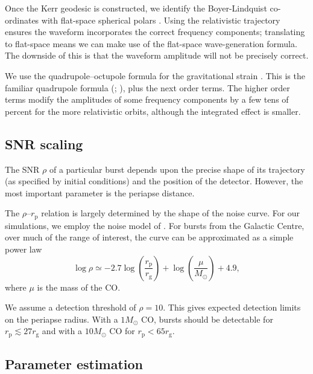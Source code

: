 \documentclass[useAMS,usedcolumn,usegraphicx,usenatbib]{mn2e}
\newcommand{\sub}[1]{\ensuremath{_\mathrm{#1}}}
\begin{document}
Once the Kerr geodesic is constructed, we identify the Boyer-Lindquist co-ordinates with flat-space spherical polars \citep{Gair2005, Babak2007}. Using the relativistic trajectory ensures the waveform incorporates the correct frequency components; translating to flat-space means we can make use of the flat-space wave-generation formula. The downside of this is that the waveform amplitude will not be precisely correct.

We use the quadrupole--octupole formula for the gravitational strain \citep{Bekenstein1973, Press1977, Yunes2008}. This is the familiar quadrupole formula (\citealt*[section 36.10]{Misner1973}; \citealt[section 17.9]{Hobson2006}), plus the next order terms. The higher order terms modify the amplitudes of some frequency components by a few tens of percent for the more relativistic orbits, although the integrated effect is smaller.

\subsection{SNR scaling}\label{sec:SNR}

The SNR $\rho$ of a particular burst depends upon the precise shape of its trajectory (as specified by initial conditions) and the position of the detector. However, the most important parameter is the periapse distance.

The $\rho$--$r\sub{p}$ relation is largely determined by the shape of the noise curve. For our simulations, we employ the noise model of \citet{Barack2004}. For bursts from the Galactic Centre, over much of the range of interest, the curve can be approximated as a simple power law \citep{Berry2013}
\begin{equation}
\log\rho \simeq -2.7\log\left(\frac{r\sub{p}}{r\sub{g}}\right) + \log\left(\frac{\mu}{M_\odot}\right) + 4.9,
\label{eq:SNR-power-law}
\end{equation}
where $\mu$ is the mass of the CO.

We assume a detection threshold of $\rho = 10$. This gives expected detection limits on the periapse radius. With a $1 M_\odot$ CO, bursts should be detectable for $r\sub{p} \lesssim 27 r\sub{g}$ and with a $10 M_\odot$ CO for $r\sub{p} < 65 r\sub{g}$.

\subsection{Parameter estimation}\label{sec:param-est-MCMC}
\end{document}
